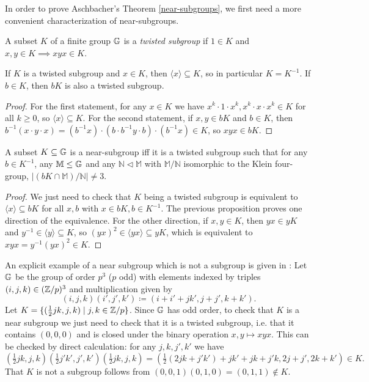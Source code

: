 \documentclass[letterpaper,11pt]{article}
\begin{document}
In order to prove Aschbacher's Theorem \ref{near-subgroups}, we first need a more convenient characterization of near-subgroups.

\begin{defn} A subset $K$ of a finite group $\mathbb{G}$ is a \emph{twisted subgroup} if $1 \in K$ and $x,y \in K \implies xyx \in K$.
\end{defn}

\begin{prop} If $K$ is a twisted subgroup and $x \in K$, then $\langle x \rangle \subseteq K$, so in particular $K = K^{-1}$. If $b \in K$, then $bK$ is also a twisted subgroup.
\end{prop}
\begin{proof} For the first statement, for any $x \in K$ we have $x^k\cdot 1\cdot x^k, x^k\cdot x\cdot x^k \in K$ for all $k \ge 0$, so $\langle x \rangle \subseteq K$. For the second statement, if $x,y \in bK$ and $b \in K$, then $b^{-1}(x\cdot y\cdot x) = (b^{-1}x) \cdot (b\cdot b^{-1}y \cdot b) \cdot (b^{-1}x) \in K$, so $xyx \in bK$.
\end{proof}

\begin{prop} A subset $K \subseteq \mathbb{G}$ is a near-subgroup iff it is a twisted subgroup such that for any $b \in K^{-1}$, any $\mathbb{M} \le \mathbb{G}$ and any $\mathbb{N} \lhd \mathbb{M}$ with $\mathbb{M}/\mathbb{N}$ isomorphic to the Klein four-group, $|(bK\cap \mathbb{M})/\mathbb{N}| \ne 3$.
\end{prop}
\begin{proof} We just need to check that $K$ being a twisted subgroup is equivalent to $\langle x\rangle \subseteq bK$ for all $x,b$ with $x \in bK, b \in K^{-1}$. The previous proposition proves one direction of the equivalence. For the other direction, if $x,y \in K$, then $yx \in yK$ and $y^{-1} \in \langle y \rangle \subseteq K$, so $(yx)^2 \in \langle yx\rangle \subseteq yK$, which is equivalent to $xyx = y^{-1}(yx)^2 \in K$.
\end{proof}

\begin{ex} An explicit example of a near subgroup which is not a subgroup is given in \cite{feder-vardi}: Let $\mathbb{G}$ be the group of order $p^3$ ($p$ odd) with elements indexed by triples $(i,j,k) \in (\mathbb{Z}/p)^3$ and multiplication given by
\[
(i,j,k)(i',j',k') \coloneqq (i+i'+jk',j+j',k+k').
\]
Let $K = \{(\tfrac{1}{2}jk,j,k) \mid j,k \in \mathbb{Z}/p\}$. Since $\mathbb{G}$ has odd order, to check that $K$ is a near subgroup we just need to check that it is a twisted subgroup, i.e. that it contains $(0,0,0)$ and is closed under the binary operation $x,y \mapsto xyx$. This can be checked by direct calculation: for any $j,k,j',k'$ we have
\[
(\tfrac{1}{2}jk,j,k)(\tfrac{1}{2}j'k',j',k')(\tfrac{1}{2}jk,j,k) = (\tfrac{1}{2}(2jk+j'k')+jk'+jk+j'k,2j+j',2k+k') \in K.
\]
That $K$ is not a subgroup follows from $(0,0,1)(0,1,0) = (0,1,1) \not\in K$.
\end{ex}
\end{document}
